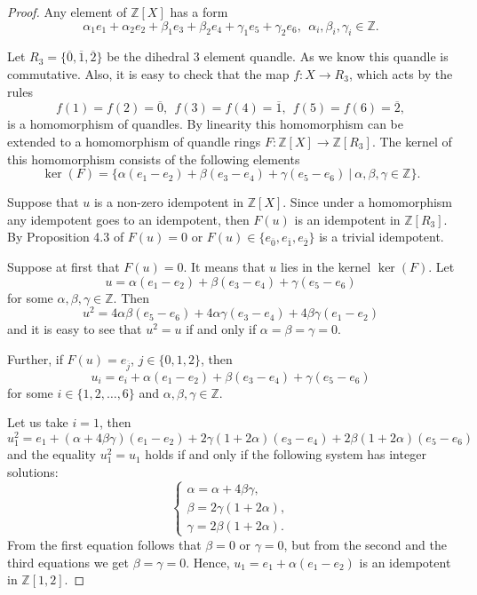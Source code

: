 \documentclass[12pt]{amsart}
\theoremstyle{definition}
\theoremstyle{remark}
\newcommand{\Z}{\mathbb{Z}}
\def\a{\alpha}
\def\b{\beta}
\def\g{\gamma}
\begin{document}
\begin{proof}
Any element of $\Z[X]$ has a form
 $$
\alpha_1 e_1 + \alpha_2 e_2 + \beta_1 e_3 +\beta_2 e_4 + \gamma_1 e_5 +  \gamma_2 e_6,~~ \alpha_i, \beta_i, \gamma_i \in \Z.
 $$

Let $R_3=\{ \overline 0, \overline 1,\overline 2\}$ be the dihedral 3 element quandle. As we know this quandle is commutative. Also, it is easy to check that the map 
$f: X \rightarrow R_3$, which acts by the rules
$$
f(1) = f(2) = \overline 0,~~f(3) = f(4) = \overline 1,~~f(5) = f(6) = \overline 2,
$$
is a homomorphism of quandles. By linearity this homomorphism can be extended to a homomorphism of quandle rings $F: \Z[X] \rightarrow \Z[R_3]$. The kernel of this homomorphism  consists of the following elements
$$
\ker (F) = \{ \alpha (e_1 - e_2) + \beta(e_3 - e_4) + \gamma (e_5 - e_6) ~ | ~  \alpha, \beta, \gamma \in \Z \}.
$$

Suppose that $u$ is a non-zero idempotent in $\Z[X]$. Since under a homomorphism any   idempotent goes to an  idempotent, then $F(u)$ is an idempotent in $\Z[R_3]$.
By Proposition 4.3 of \cite{BPS1}  $F(u) = 0$ or $F(u) \in \{ e_{\overline 0}, e_{\overline 1}, e_{\overline 2} \}$ is a trivial idempotent.

Suppose at first that $F(u) = 0$. It means that $u$ lies in the kernel $\ker (F)$. Let
$$
u = \alpha (e_1 - e_2) + \beta(e_3 - e_4) + \gamma (e_5 - e_6) 
$$
for some $\alpha, \beta, \gamma \in \Z$. Then
$$
u^2 = 4 \alpha \beta (e_5 - e_6) + 4 \alpha \gamma (e_3 - e_4) +4 \beta \gamma (e_1 - e_2)
$$
and it is easy to see that $u^2 = u$ if and only if $\alpha =  \beta =  \gamma = 0$.

Further, if $F(u) = e_{\overline j}$, $j \in \{ 0, 1, 2 \}$, then 
$$
u_i = e_i + \alpha (e_1 - e_2) + \beta (e_3 - e_4) + \gamma (e_5 - e_6) 
$$
for some $i \in \{ 1, 2, \ldots , 6 \}$ and $\alpha, \beta, \gamma \in \Z$.

Let us take $i = 1$, then 
$$
u_1^2 = e_1 + (\a + 4 \b \g) (e_1 - e_2) + 2 \g (1 + 2 \a) (e_3 - e_4) + 2 \b (1 + 2 \a) (e_5 - e_6) 
$$
and the equality $u_1^2 = u_1$ holds if and only if the following system has integer solutions:
$$
\begin{cases}
\a = \a + 4 \b \g,\\
\b = 2  \g (1 + 2 \a), \\
\g = 2 \b (1 + 2 \a). 
\end{cases}
$$ 
From the first equation follows that $\b=0$ or $\g = 0$, but from the second and the third equations we get $\b=\g = 0$. Hence,  $u_1 =  e_1 + \alpha (e_1 - e_2)$  is an idempotent in $\Z[1, 2]$.


\end{proof}
\end{document}
